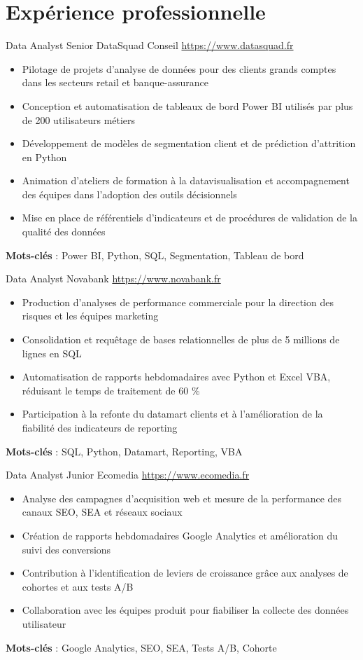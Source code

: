 \documentclass[a4paper, serif, 10pt]{moderncv}
\begin{document}
\section{Expérience professionnelle}

        {Data Analyst Senior}
        {DataSquad Conseil}
        {\url{https://www.datasquad.fr}}
        {}
        {\begin{itemize}
\item Pilotage de projets d'analyse de données pour des clients grands comptes dans les secteurs retail et banque-assurance
\item Conception et automatisation de tableaux de bord Power BI utilisés par plus de 200 utilisateurs métiers
\item Développement de modèles de segmentation client et de prédiction d'attrition en Python
\item Animation d'ateliers de formation à la datavisualisation et accompagnement des équipes dans l'adoption des outils décisionnels
\item Mise en place de référentiels d'indicateurs et de procédures de validation de la qualité des données
\end{itemize}
\textbf{Mots-clés} : Power BI, Python, SQL, Segmentation, Tableau de bord}

        {Data Analyst}
        {Novabank}
        {\url{https://www.novabank.fr}}
        {}
        {\begin{itemize}
\item Production d'analyses de performance commerciale pour la direction des risques et les équipes marketing
\item Consolidation et requêtage de bases relationnelles de plus de 5 millions de lignes en SQL
\item Automatisation de rapports hebdomadaires avec Python et Excel VBA, réduisant le temps de traitement de 60 \%
\item Participation à la refonte du datamart clients et à l'amélioration de la fiabilité des indicateurs de reporting
\end{itemize}
\textbf{Mots-clés} : SQL, Python, Datamart, Reporting, VBA}

        {Data Analyst Junior}
        {Ecomedia}
        {\url{https://www.ecomedia.fr}}
        {}
        {\begin{itemize}
\item Analyse des campagnes d'acquisition web et mesure de la performance des canaux SEO, SEA et réseaux sociaux
\item Création de rapports hebdomadaires Google Analytics et amélioration du suivi des conversions
\item Contribution à l'identification de leviers de croissance grâce aux analyses de cohortes et aux tests A/B
\item Collaboration avec les équipes produit pour fiabiliser la collecte des données utilisateur
\end{itemize}
\textbf{Mots-clés} : Google Analytics, SEO, SEA, Tests A/B, Cohorte}
\end{document}
